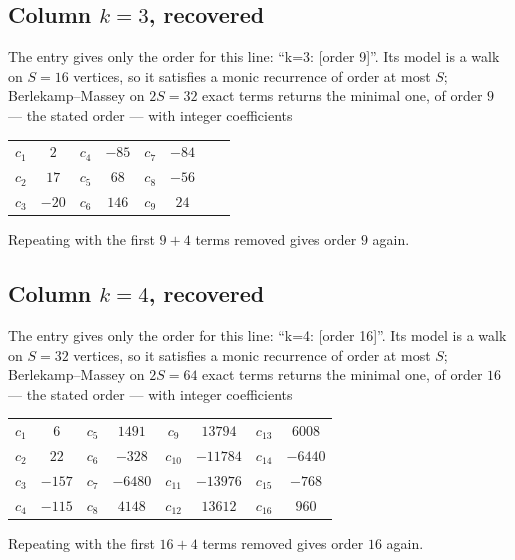 \documentclass[11pt,a4paper]{article}
\theoremstyle{plain}
\theoremstyle{definition}
\begin{document}
\subsection*{Column $k=3$, recovered}
The entry gives only the order for this line: ``k=3: [order 9]''. Its model is a walk on
$S=16$ vertices, so it satisfies a monic recurrence of order at most $S$;
Berlekamp--Massey on $2S=32$ exact terms returns the minimal one, of order
$9$ --- the stated order --- with integer coefficients
\begin{center}\small\begin{tabular}{cccccccc}
$c_{1}$ & $2$ & $c_{4}$ & $-85$ & $c_{7}$ & $-84$ &  &  \\
$c_{2}$ & $17$ & $c_{5}$ & $68$ & $c_{8}$ & $-56$ &  &  \\
$c_{3}$ & $-20$ & $c_{6}$ & $146$ & $c_{9}$ & $24$ &  &  \\
\end{tabular}\end{center}
Repeating with the first $9+4$ terms removed gives order $9$ again.

\subsection*{Column $k=4$, recovered}
The entry gives only the order for this line: ``k=4: [order 16]''. Its model is a walk on
$S=32$ vertices, so it satisfies a monic recurrence of order at most $S$;
Berlekamp--Massey on $2S=64$ exact terms returns the minimal one, of order
$16$ --- the stated order --- with integer coefficients
\begin{center}\small\begin{tabular}{cccccccc}
$c_{1}$ & $6$ & $c_{5}$ & $1491$ & $c_{9}$ & $13794$ & $c_{13}$ & $6008$ \\
$c_{2}$ & $22$ & $c_{6}$ & $-328$ & $c_{10}$ & $-11784$ & $c_{14}$ & $-6440$ \\
$c_{3}$ & $-157$ & $c_{7}$ & $-6480$ & $c_{11}$ & $-13976$ & $c_{15}$ & $-768$ \\
$c_{4}$ & $-115$ & $c_{8}$ & $4148$ & $c_{12}$ & $13612$ & $c_{16}$ & $960$ \\
\end{tabular}\end{center}
Repeating with the first $16+4$ terms removed gives order $16$ again.
\end{document}
